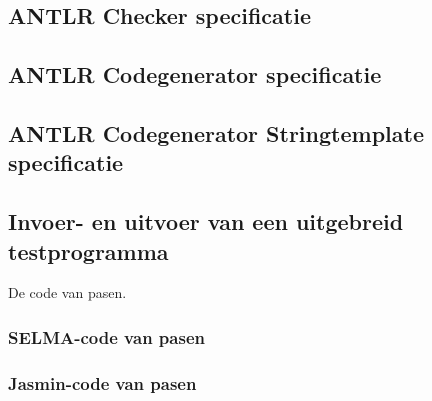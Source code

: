 \documentclass[]{article}
\begin{document}
\newpage
\subsection{ANTLR Checker specificatie}


\newpage
\subsection{ANTLR Codegenerator specificatie}


\begin{landscape}
\newpage
\subsection{ANTLR Codegenerator Stringtemplate specificatie}

\end{landscape}

\newpage
\subsection{Invoer- en uitvoer van een uitgebreid testprogramma}
De code van pasen.

\subsubsection{SELMA-code van pasen}


\newpage
\begin{landscape}
\subsubsection{Jasmin-code van pasen}

\end{landscape}
\end{document}
